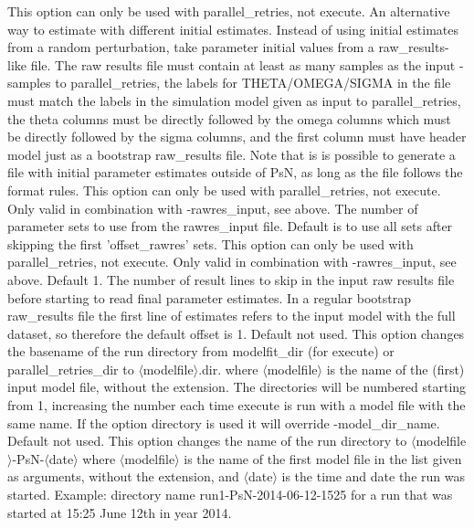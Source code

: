 \begin{optionlist}
This option can only be used with parallel\_retries, not execute. An alternative way to estimate with different initial estimates. 
Instead of using initial estimates from a random perturbation, take parameter initial values from a raw\_results-like file.
The raw results file must contain at least as many samples as the input -samples to parallel\_retries, the labels for  THETA/OMEGA/SIGMA 
in the file must match the labels in the simulation model given as input to parallel\_retries, 
the theta columns must be directly followed by the omega columns which must be directly followed by the sigma columns, and the first column 
must have header model just as a bootstrap raw\_results file. Note that is is possible to generate a file with initial parameter estimates outside of PsN, 
as long as the file follows the format rules.
\nextopt
{}
This option can only be used with parallel\_retries, not execute. Only valid in combination with -rawres\_input, see above. The number of
parameter sets to use from the rawres\_input file. Default is to use all sets after skipping the first 'offset\_rawres' sets.
\nextopt
{}
This option can only be used with parallel\_retries, not execute. Only valid in combination with -rawres\_input, see above. Default 1.
The number of result lines to skip in the input raw results file before starting to read final parameter estimates. In a regular
bootstrap raw\_results file the first line of estimates refers to the input model with the full dataset, so therefore the default offset is 1.
\nextopt
{}
Default not used. This option changes the basename of the run directory from modelfit\_dir (for execute) or
parallel\_retries\_dir to $\langle$modelfile$\rangle$.dir. where $\langle$modelfile$\rangle$ 
is the name of the (first) input model file, without the extension. 
The directories will be numbered starting from 1, increasing the number each time execute is run with a model file with the 
same name. If the option directory is used it will override -model\_dir\_name.
\nextopt
{}
Default not used. This option changes the name of the run directory to $\langle$modelfile$\rangle$-PsN-$\langle$date$\rangle$
where $\langle$modelfile$\rangle$ is the name of the first model file in the list given as arguments, without the extension,
and $\langle$date$\rangle$ is the time and date the run was started. 
Example: directory name run1-PsN-2014-06-12-1525 for a run that was started at 15:25 June 12th in year 2014.

\end{optionlist}
